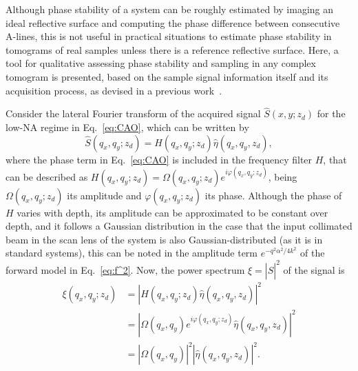 Although phase stability of a system can be roughly estimated by imaging an ideal reflective surface and computing the phase difference between consecutive A-lines, this is not useful in practical situations to estimate phase stability in tomograms of real samples unless there is a reference reflective surface. Here, a tool for qualitative assessing phase stability and sampling in any complex tomogram is presented, based on the sample signal information itself and its acquisition process, as devised in a previous work~\cite{Cuartas-Velez2017_Formacion}.

Consider the lateral Fourier transform of the acquired signal $\hat{S}(x,y;z_d)$ for the low-NA regime in Eq.~\eqref{eq:CAO}, which can be written by
\begin{equation}
    \hat{S}(q_x, q_y; z_d) = H(q_x, q_y; z_d) \hat{\eta}(q_x, q_y, z_d),
\end{equation}
where the phase term in Eq.~\eqref{eq:CAO} is included in the frequency filter $H$, that can be described as $H(q_x,q_y; z_d)=\Omega(q_x, q_y; z_d)e^{i\varphi(q_x, q_y; z_d)}$, being $\Omega(q_x, q_y; z_d)$ its amplitude and $\varphi(q_x, q_y; z_d)$ its phase. Although the phase of $H$ varies with depth, its amplitude can be approximated to be constant over depth, and it follows a Gaussian distribution in the case that the input collimated beam in the scan lens of the system is also Gaussian-distributed (as it is in standard systems), this can be noted in the amplitude term $e^{-q^2\alpha^2/4k^2}$ of the forward model in Eq.~\eqref{eq:f^2}. Now, the power spectrum $\xi = |\hat{S}|^2$ of the signal is
\begin{align}
    \xi(q_x, q_y; z_d) &= |H(q_x, q_y; z_d) \hat{\eta}( q_x, q_y, z_d)|^2 \nonumber\\
    &= |\Omega(q_x, q_y)e^{i\varphi(q_x, q_y; z_d)} \hat{\eta}(q_x, q_y, z_d)|^2 \nonumber\\
    &= |\Omega(q_x, q_y)|^2 |\hat{\eta}(q_x, q_y, z_d)|^2.
\end{align}

